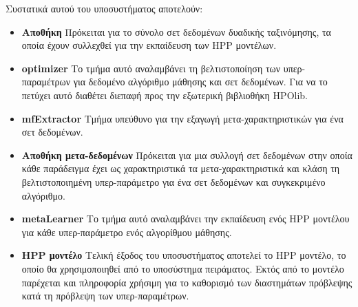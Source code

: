 Συστατικά αυτού του υποσυστήματος αποτελούν:
\begin{itemize}
	\item \textbf{Αποθήκη} Πρόκειται για το σύνολο σετ δεδομένων δυαδικής ταξινόμησης, τα οποία έχουν συλλεχθεί για την εκπαίδευση των HPP μοντέλων.
	\item \textbf{optimizer} Το τμήμα αυτό αναλαμβάνει τη βελτιστοποίηση των υπερ-παραμέτρων για δεδομένο αλγόριθμο μάθησης και σετ δεδομένων. Για να το πετύχει αυτό διαθέτει διεπαφή προς την εξωτερική βιβλιοθήκη HPOlib.
	\item \textbf{mfExtractor} Τμήμα υπεύθυνο για την εξαγωγή μετα-χαρακτηριστικών για ένα σετ δεδομένων.
	\item \textbf{Αποθήκη μετα-δεδομένων} Πρόκειται για μια συλλογή σετ δεδομένων στην οποία κάθε παράδειγμα έχει ως χαρακτηριστικά τα μετα-χαρακτηριστικά και κλάση τη βελτιστοποιημένη υπερ-παράμετρο για ένα σετ δεδομένων και συγκεκριμένο αλγόριθμο.
	\item \textbf{metaLearner} Το τμήμα αυτό αναλαμβάνει την εκπαίδευση ενός HPP μοντέλου για κάθε υπερ-παράμετρο ενός αλγορίθμου μάθησης.
	\item \textbf{HPP μοντέλο} Τελική έξοδος του υποσυστήματος αποτελεί το HPP μοντέλο, το οποίο θα χρησιμοποιηθεί από το υποσύστημα πειράματος. Εκτός από το μοντέλο παρέχεται και πληροφορία χρήσιμη για το καθορισμό των διαστημάτων πρόβλεψης κατά τη πρόβλεψη των υπερ-παραμέτρων.
\end{itemize}



